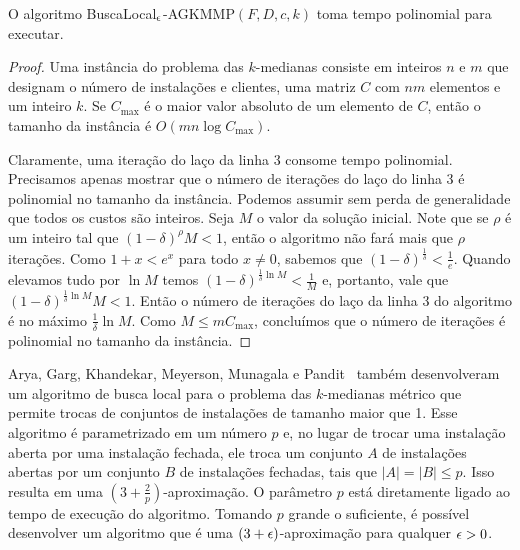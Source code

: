 \begin{theorem}
    O algoritmo {\sc BuscaLocal$_\epsilon$-AGKMMP$(F,D,c,k)$} toma tempo polinomial para executar.
\end{theorem}
\begin{proof}
    Uma instância do problema das $k$-medianas consiste em inteiros $n$ e $m$ que designam o número de instalações e clientes, uma matriz $C$ com $nm$ elementos e um inteiro $k$. Se $C_\text{max}$ é o maior valor absoluto de um elemento de $C$, então o tamanho da instância é $O(mn\log{C_\text{max}})$. 

    Claramente, uma iteração do laço da linha 3 consome tempo polinomial. Precisamos apenas mostrar que o número de iterações do laço do linha 3 é polinomial no tamanho da instância.
    Podemos assumir sem perda de generalidade que todos os custos são inteiros. Seja $M$ o valor da solução inicial. Note que se $\rho$ é um inteiro tal que $(1-\delta)^\rho M < 1$, então o algoritmo não fará mais que $\rho$ iterações. Como $ 1 + x < e^x$ para todo $x\neq 0$, sabemos que $(1 - \delta)^{\frac{1}{\delta}} < \frac{1}{e}$. Quando elevamos tudo por $\ln M$ temos $(1- \delta)^{\frac{1}{\delta}\ln M} < \frac{1}{M}$ e, portanto, vale que $ (1- \delta)^{\frac{1}{\delta}\ln M}M < 1$. Então o número de iterações do laço da linha 3 do algoritmo é no máximo $\frac{1}{\delta}\ln M$. Como $M \leq m C_\text{max}$, concluímos que o número de iterações é polinomial no tamanho da instância.
\end{proof}

Arya, Garg, Khandekar, Meyerson, Munagala e Pandit~\cite{AryaLocal} também desenvolveram um algoritmo de busca local para o problema das $k$-medianas métrico que permite trocas de conjuntos de instalações de tamanho maior que 1. Esse algoritmo é parametrizado em um número $p$ e, no lugar de trocar uma instalação aberta por uma instalação fechada, ele troca um conjunto $A$ de instalações abertas por um conjunto $B$ de instalações fechadas, tais que $|A| = |B| \leq p$. Isso resulta em uma $(3 + \frac{2}{p})$-aproximação. O parâmetro $p$ está diretamente ligado ao tempo de execução do algoritmo. Tomando $p$ grande o suficiente, é possível desenvolver um algoritmo que é uma $(3+\epsilon)$-aproximação para qualquer $\epsilon >0$.
